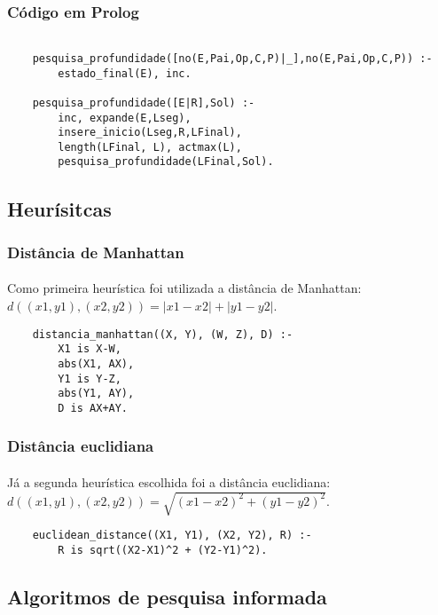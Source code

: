 \documentclass{article}
\begin{document}
\subsubsection{Código em Prolog}
\begin{verbatim}

    pesquisa_profundidade([no(E,Pai,Op,C,P)|_],no(E,Pai,Op,C,P)) :- 
        estado_final(E), inc.
        
    pesquisa_profundidade([E|R],Sol) :- 
        inc, expande(E,Lseg),
        insere_inicio(Lseg,R,LFinal),
        length(LFinal, L), actmax(L),
        pesquisa_profundidade(LFinal,Sol).
\end{verbatim}

\subsection{Heurísitcas}
\subsubsection{Distância de Manhattan}
\paragraph{} Como primeira heurística foi utilizada a distância de Manhattan: $d((x1, y1), (x2, y2)) = |x1 - x2| + |y1 - y2|$.

\begin{verbatim}
    distancia_manhattan((X, Y), (W, Z), D) :-
        X1 is X-W,
        abs(X1, AX),
        Y1 is Y-Z,
        abs(Y1, AY),
        D is AX+AY.  
\end{verbatim}

\subsubsection{Distância euclidiana}
\paragraph{} Já a segunda heurística escolhida foi a distância euclidiana: $d((x1, y1), (x2, y2)) = \sqrt{(x1-x2)^2 + (y1-y2)^2}$.

\begin{verbatim}
    euclidean_distance((X1, Y1), (X2, Y2), R) :- 
        R is sqrt((X2-X1)^2 + (Y2-Y1)^2). 
\end{verbatim}

\subsection{Algoritmos de pesquisa informada}
\end{document}
